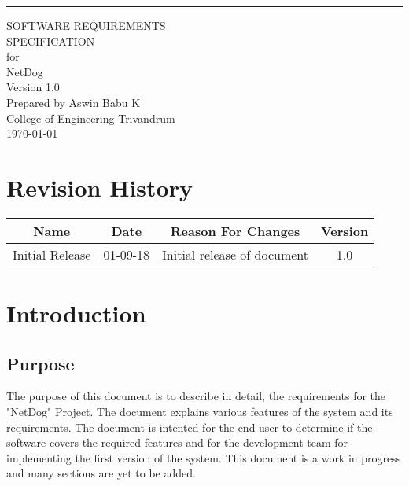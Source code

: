 \documentclass{scrreprt}
\date{02-09-2018}
\def\myversion{1.0}
\begin{document}
\begin{flushright}
    \rule{16cm}{5pt}\vskip1cm
    \begin{bfseries}
        \Huge{SOFTWARE REQUIREMENTS\\ SPECIFICATION}\\
        \vspace{1.9cm}
        for\\
        \vspace{1.9cm}
        NetDog\\
        \vspace{1.9cm}
        \LARGE{Version \myversion}\\
        \vspace{1.9cm}
        Prepared by Aswin Babu K\\
        \vspace{1.9cm}
        College of Engineering Trivandrum\\
        \vspace{1.9cm}
        \today\\
    \end{bfseries}
\end{flushright}

\tableofcontents


\chapter*{Revision History}

\begin{center}
    \begin{tabular}{|c|c|c|c|}
        \hline
	    Name & Date & Reason For Changes & Version\\
        \hline
	    Initial Release & 01-09-18 & Initial release of document & 1.0\\
        \hline
    \end{tabular}
\end{center}

\chapter{Introduction}

\section{Purpose}
The purpose of this document is to describe in detail, the requirements for
the "NetDog" Project. The document explains various features of the system and
its requirements. The document is intented for the end user to determine if the
software covers the required features and for the development team for
implementing the first version of the system. This document is a work in progress
and many sections are yet to be added.
\end{document}
